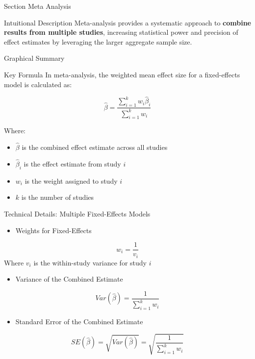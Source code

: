 
\begin{frame}{Section}
\centering
\Huge{Meta Analysis}
\end{frame}


\begin{frame}{Intuitional Description}
Meta-analysis provides a systematic approach to \textbf{combine results from multiple studies}, increasing statistical power and precision of effect estimates by leveraging the larger aggregate sample size.
\end{frame}

\begin{frame}{Graphical Summary}

\end{frame}


\begin{frame}{Key Formula}
In meta-analysis, the weighted mean effect size for a fixed-effects model is calculated as:

$$\hat{\beta} = \frac{\sum_{i=1}^{k} w_i \hat{\beta}_i}{\sum_{i=1}^{k} w_i}$$

Where:
\begin{itemize}
\item $\hat{\beta}$ is the combined effect estimate across all studies
\item $\hat{\beta}_i$ is the effect estimate from study $i$
\item $w_i$ is the weight assigned to study $i$
\item $k$ is the number of studies
\end{itemize}
\end{frame}


\begin{frame}{Technical Details: Multiple Fixed-Effects Models}

\begin{itemize}
\item Weights for Fixed-Effects
\end{itemize}
    $$w_i = \frac{1}{v_i}$$
    Where $v_i$ is the within-study variance for study $i$

\begin{itemize}
\item Variance of the Combined Estimate
\end{itemize}
    $$Var(\hat{\beta}) = \frac{1}{\sum_{i=1}^{k} w_i}$$

\begin{itemize}
\item Standard Error of the Combined Estimate
\end{itemize}
    $$SE(\hat{\beta}) = \sqrt{Var(\hat{\beta})} = \sqrt{\frac{1}{\sum_{i=1}^{k} w_i}}$$

\end{frame}

